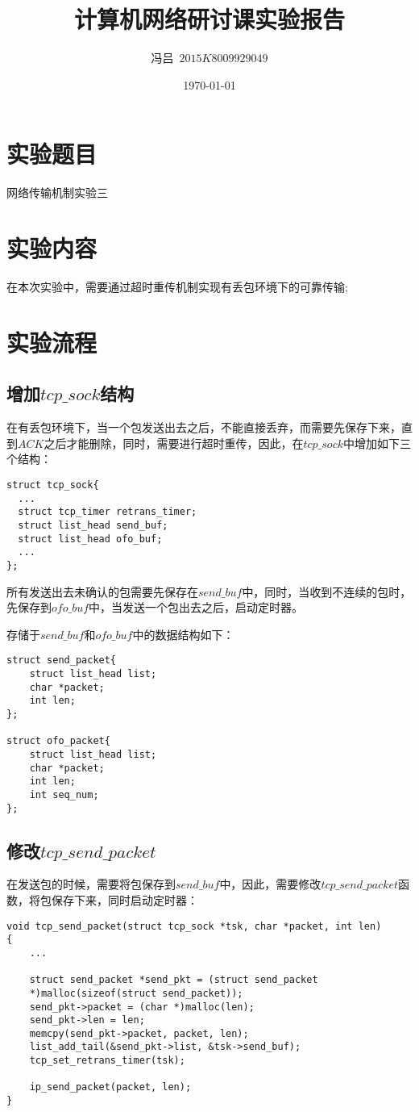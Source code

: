 \documentclass[UTF8,noindent]{ctexart}
\title{\CJKfamily{zhkai}计算机网络研讨课实验报告}
\author{{\CJKfamily{zhkai}冯吕}\ $2015K8009929049$}
\date{\today}
\begin{document}
\maketitle
{}
\section{{实验题目}}网络传输机制实验三
\section{{实验内容}}
在本次实验中，需要通过超时重传机制实现有丢包环境下的可靠传输;
\section{{实验流程}}
\subsection{增加$tcp\_sock$结构}
在有丢包环境下，当一个包发送出去之后，不能直接丢弃，而需要先保存下来，直到$ACK$之后才能删除，同时，需要进行超时重传，因此，在$tcp\_sock$中增加如下三个结构：
\begin{lstlisting}
struct tcp_sock{
  ...
  struct tcp_timer retrans_timer;
  struct list_head send_buf;
  struct list_head ofo_buf;
  ...
};
\end{lstlisting}
所有发送出去未确认的包需要先保存在$send\_buf$中，同时，当收到不连续的包时，先保存到$ofo\_buf$中，当发送一个包出去之后，启动定时器。

存储于$send\_buf$和$ofo\_buf$中的数据结构如下：
\begin{lstlisting}
struct send_packet{
	struct list_head list;
	char *packet;
	int len;
};

struct ofo_packet{
	struct list_head list;
	char *packet;
	int len;
	int seq_num;
};
\end{lstlisting}

\subsection{修改$tcp\_send\_packet$}
在发送包的时候，需要将包保存到$send\_buf$中，因此，需要修改$tcp\_send\_packet$函数，将包保存下来，同时启动定时器：
\begin{lstlisting}
void tcp_send_packet(struct tcp_sock *tsk, char *packet, int len) 
{
    ...

	struct send_packet *send_pkt = (struct send_packet 
	*)malloc(sizeof(struct send_packet));
	send_pkt->packet = (char *)malloc(len);
	send_pkt->len = len;
	memcpy(send_pkt->packet, packet, len);
	list_add_tail(&send_pkt->list, &tsk->send_buf);
	tcp_set_retrans_timer(tsk);

	ip_send_packet(packet, len);
}
\end{lstlisting}
\end{document}
